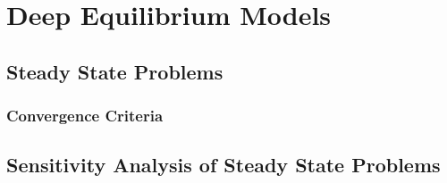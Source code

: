 \chapter{Deep Equilibrium Models}
\label{chapter:deep_equilibrium_models}

\section{Steady State Problems}
\label{sec:steady_state_problems}

\subsection{Convergence Criteria}
\label{subsec:ssproblem_convergence_criteria}

\section{Sensitivity Analysis of Steady State Problems}
\label{sec:sensitivity_analysis_ssproblems}
